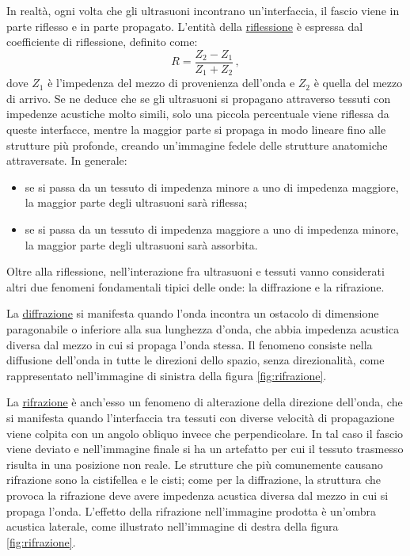 \documentclass{report}
\newcommand{\figref}[1]{figura \ref{#1}}
\numberwithin{equation}{section}
\numberwithin{figure}{section}
\begin{document}
In realtà, ogni volta che gli ultrasuoni incontrano un’interfaccia, il fascio viene in parte riflesso e in parte propagato. L’entità della \underline{riflessione} è espressa dal coefficiente di riflessione, definito come:
\begin{equation}
    R = \frac{Z_2-Z_1}{Z_1+Z_2}\,,
\end{equation}
dove $Z_1$ è l'impedenza del mezzo di provenienza dell'onda e $Z_2$ è quella del mezzo di arrivo. Se ne deduce che se gli ultrasuoni si propagano attraverso tessuti con impedenze acustiche molto simili, solo una piccola percentuale viene riflessa da queste interfacce, mentre la maggior parte si propaga in modo lineare fino alle strutture più profonde, creando un’immagine fedele delle strutture anatomiche attraversate. In generale:
\begin{itemize}[label=$-$]
    \item se si passa da un tessuto di impedenza minore a uno di impedenza maggiore, la maggior parte degli ultrasuoni sarà riflessa;
    \item se si passa da un tessuto di impedenza maggiore a uno di impedenza minore, la maggior parte degli ultrasuoni sarà assorbita.
\end{itemize}

Oltre alla riflessione, nell'interazione fra ultrasuoni e tessuti vanno considerati altri due fenomeni fondamentali tipici delle onde: la diffrazione e la rifrazione.

La \underline{diffrazione} si manifesta quando l'onda incontra un ostacolo di dimensione paragonabile o inferiore alla sua lunghezza d'onda, che abbia impedenza acustica diversa dal mezzo in cui si propaga l'onda stessa. Il fenomeno consiste nella diffusione dell'onda in tutte le direzioni dello spazio, senza direzionalità, come rappresentato nell'immagine di sinistra della \figref{fig:rifrazione}.

La \underline{rifrazione} è anch'esso un fenomeno di alterazione della direzione dell'onda, che si manifesta quando l’interfaccia tra tessuti con diverse velocità di propagazione viene colpita con un angolo obliquo invece che perpendicolare. In tal caso il fascio viene deviato e nell'immagine finale si ha un artefatto per cui il tessuto trasmesso risulta in una posizione non reale. Le strutture che più comunemente causano rifrazione sono la cistifellea e le cisti; come per la diffrazione, la struttura che provoca la rifrazione deve avere impedenza acustica diversa dal mezzo in cui si propaga l'onda. L'effetto della rifrazione nell'immagine prodotta è un'ombra acustica laterale, come illustrato nell'immagine di destra della \figref{fig:rifrazione}.
\end{document}

